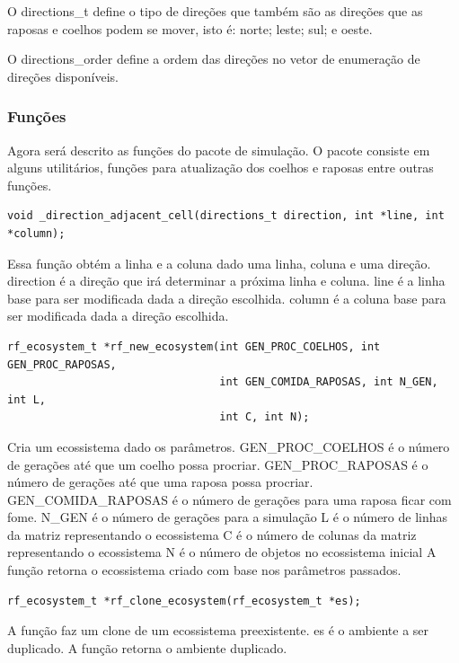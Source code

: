 \documentclass{article}
\begin{document}
O directions\_t define o tipo de direções que também são as direções que as raposas e coelhos podem se mover, isto é: norte; leste; sul; e oeste.

O directions\_order define a ordem das direções no vetor de enumeração de direções disponíveis.

\subsubsection{Funções}

Agora será descrito as funções do pacote de simulação. O pacote consiste em alguns utilitários, funções para atualização dos coelhos e raposas entre outras funções.

\begin{verbatim}
void _direction_adjacent_cell(directions_t direction, int *line, int *column);
      \end{verbatim}

Essa função obtém a linha e a coluna dado uma linha, coluna e uma direção. direction é a direção que irá determinar a próxima linha e coluna. line é a linha base para ser modificada dada a direção escolhida. column é a coluna base para ser modificada dada a direção escolhida.

\begin{verbatim}
rf_ecosystem_t *rf_new_ecosystem(int GEN_PROC_COELHOS, int GEN_PROC_RAPOSAS,
                                 int GEN_COMIDA_RAPOSAS, int N_GEN, int L,
                                 int C, int N);
      \end{verbatim}

Cria um ecossistema dado os parâmetros.
GEN\_PROC\_COELHOS é o número de gerações até que um coelho possa procriar.
GEN\_PROC\_RAPOSAS é o número de gerações até que uma raposa possa procriar.
GEN\_COMIDA\_RAPOSAS é o número de gerações para uma raposa ficar com fome.
N\_GEN é o número de gerações para a simulação
L é o número de linhas da matriz representando o ecossistema
C é o número de colunas da matriz representando o ecossistema
N é o número de objetos no ecossistema inicial
A função retorna o ecossistema criado com base nos parâmetros passados.


\begin{verbatim}
rf_ecosystem_t *rf_clone_ecosystem(rf_ecosystem_t *es);
      \end{verbatim}

A função faz um clone de um ecossistema preexistente.
es é o ambiente a ser duplicado.
A função retorna o ambiente duplicado.
\end{document}

